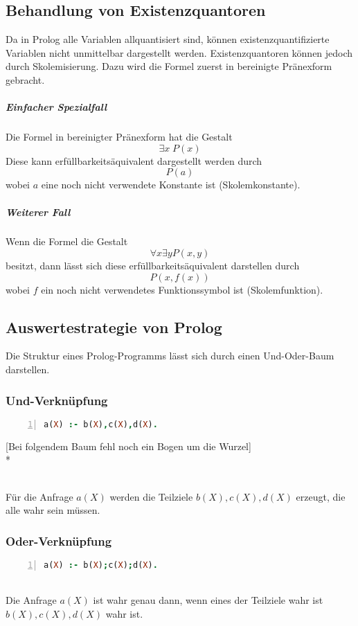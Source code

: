 \documentclass[a4paper]{scrartcl}
\begin{document}
\subsection{Behandlung von Existenzquantoren}
Da in Prolog alle Variablen allquantisiert sind, können existenzquantifizierte Variablen nicht unmittelbar dargestellt werden. Existenzquantoren können jedoch durch Skolemisierung. Dazu wird die Formel zuerst in bereinigte Pränexform gebracht.
\subparagraph{Einfacher Spezialfall} Die Formel in bereinigter Pränexform hat die Gestalt \[\exists x \; P(x)\]
Diese kann erfüllbarkeitsäquivalent dargestellt werden durch \[P(a)\] wobei $a$ eine noch nicht verwendete Konstante ist (Skolemkonstante).
\subparagraph{Weiterer Fall} Wenn die Formel die Gestalt
\[\forall x \exists y P(x,y)\]
besitzt, dann lässt sich diese erfüllbarkeitsäquivalent darstellen durch
\[P(x,f(x))\]
wobei $f$ ein noch nicht verwendetes Funktionssymbol ist (Skolemfunktion).

\subsection{Auswertestrategie von Prolog}
Die Struktur eines Prolog-Programms lässt sich durch einen Und-Oder-Baum darstellen.
\subsubsection{Und-Verknüpfung}
\begin{lstlisting}[numbers=left, tabsize=4, language=Prolog]
a(X) :- b(X),c(X),d(X).
\end{lstlisting}
[Bei folgendem Baum fehl noch ein Bogen um die Wurzel]\\*
\\
Für die Anfrage $a(X)$ werden die Teilziele $b(X),c(X),d(X)$ erzeugt, die alle wahr sein müssen.
\subsubsection{Oder-Verknüpfung}
\begin{lstlisting}[numbers=left, tabsize=4, language=Prolog]
a(X) :- b(X);c(X);d(X).
\end{lstlisting}
\\
Die Anfrage $a(X)$ ist wahr genau dann, wenn eines der Teilziele wahr ist $b(X),c(X),d(X)$ wahr ist.
\end{document}
